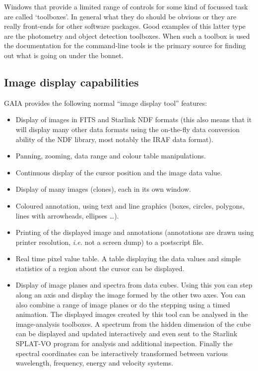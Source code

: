 \documentclass[twoside,11pt]{article}
\newcommand{\xref}[3]{#1}
\newcommand{\xlabel}[1]{}
\renewcommand{\_}{\texttt{\symbol{95}}}
\begin{document}
Windows that provide a limited range of controls for some kind of
focussed task are called `toolboxes'. In general what they do should
be obvious or they are really front-ends for other software
packages. Good examples of this latter type are the photometry and
object detection toolboxes. When such a toolbox is used the
documentation for the command-line tools is the primary source for
finding out what is going on under the bonnet.

\subsection{\xlabel{image_display_capabilities}Image display capabilities}
GAIA provides the following normal ``image display tool'' features:
\begin{itemize}
\item Display of images in FITS and Starlink \xref{NDF}{sun33}{}
  formats (this also means that it will display many other data formats
  using the on-the-fly data conversion ability of the NDF library, most
  notably the IRAF data format).

\item Panning, zooming, data range and colour table manipulations.

\item Continuous display of the cursor position and the image data
  value.

\item Display of many images (clones), each in its own window.

\item Coloured annotation, using text and line graphics (boxes,
  circles, polygons, lines with arrowheads, ellipses \ldots).

\item Printing of the displayed image and annotations (annotations
  are drawn using printer resolution, \textit{i.e.} not a screen dump)
  to a postscript file.

\item Real time pixel value table. A table displaying the data
  values and simple statistics of a region about the cursor can be
  displayed.

\item Display of image planes and spectra from data cubes. Using this you can
  step along an axis and display the image formed by the other two axes.  You
  can also combine a range of image planes or do the stepping using a timed
  animation. The displayed images created by this tool can be analysed in the
  image-analysis toolboxes. A spectrum from the hidden dimension of the cube
  can be displayed and updated interactively and even sent to the Starlink
  SPLAT-VO program for analysis and additional inspection. Finally the
  spectral coordinates can be interactively transformed between various
  wavelength, frequency, energy and velocity systems.


\end{itemize}
\end{document}
